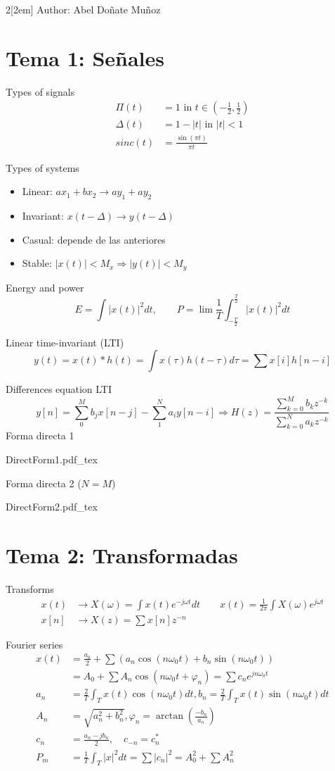 \documentclass[leqno]{article}
\newcommand{\incfig}[1]{%
{\center
\def\svgwidth{0.9\columnwidth}
{#1.pdf_tex}
\par}
}
\begin{document}
\begin{multicols}{2}[\columnsep2em]
Author: Abel Doñate Muñoz
\section{Tema 1: Señales}

Types of signals
\begin{align*}
  \Pi(t) &= 1 \text{ in } t\in (-\frac{1}{2}, \frac{1}{2}) \\
  \Delta(t)&= 1-|t| \text{ in } |t|<1 \\
  sinc(t) &= \frac{\sin(\pi t)}{\pi t}
\end{align*}

Types of systems
\begin{itemize}[topsep=-6pt, itemsep=0pt]
  \item Linear: $ax_1+bx_2 \to ay_1+ay_2$
  \item Invariant: $x(t-\Delta ) \to y(t-\Delta)$
  \item Casual: depende de las anteriores 
  \item Stable: $|x(t)|<M_x \Rightarrow |y(t)|<M_y$
\end{itemize}

Energy and power
\[
E = \int |x(t)|^2dt, \qquad P = \lim \frac{1}{T} \int_{-\frac{T}{2}}^{\frac{T}{2}} |x(t)|^2dt
\] 

Linear time-invariant (LTI)
\[
y(t) = x(t)\ast h(t) = \int x(\tau )h(t-\tau )d\tau = \sum x[i]h[n-i]
\] 

Differences equation LTI
\[
y[n] = \sum_0^M b_jx[n-j] - \sum_1^N a_iy[n-i] \Rightarrow H(z) = \frac{\sum_{k=0}^M b_kz^{-k}}{\sum_{k=0}^{N}a_kz^{-k}}
\] 
Forma directa 1
\incfig{DirectForm1}

Forma directa 2 ($N=M$)
\incfig{DirectForm2}

\section{Tema 2: Transformadas}

Transforms
\begin{align*}
  x(t) &\to X(\omega )= \int x(t)e^{-j\omega t}dt \qquad x(t)= \frac{1}{2\pi}\int X(\omega )e^{j\omega t} \\
  x[n] &\to X(z) = \sum x[n]z^{-n}
\end{align*}

Fourier series
\begin{align*}
	x(t) &= \frac{a_0}{2} + \sum \left( a_n\cos(n\omega _0t) + b_n \sin(n\omega _0t )\right)\\
		 &= A_0 + \sum A_n\cos(n\omega _0t + \varphi_n) = \sum c_n e^{jn\omega_0 t}\\
	a_n &= \frac{2}{T}\int_T x(t)\cos(n\omega _0t)dt,   b_n = \frac{2}{T}\int_T x(t)\sin(n\omega _0t)dt\\
	A_n &= \sqrt{a_n^2 + b_n^2}, \varphi_n = \arctan(\frac{-b_n}{a_n}) \\
	c_n &= \frac{a_n-jb_n}{2}, \quad c_{-n} = c_n^*\\
	P_m &= \frac{1}{T}\int_T|x|^2dt= \sum |c_n|^2= A_0^2 + \sum A_n^2
\end{align*}


\end{multicols}
\end{document}
